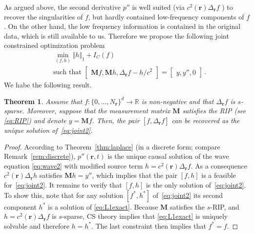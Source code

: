 \documentclass[11pt]{article}
\newcommand{\rr}{\mathbf r}
\newcommand{\data}{y}
\newcommand{\source}{f}
\newcommand{\Lsource}{h}
\newcommand{\R}{\mathbb R}
\newcommand\norm[1]{\Vert#1\Vert}
\newcommand{\set}[1]{\{#1\}}
\newcommand{\fullop}{\mathbf M}
\newtheorem{theorem}{Theorem}[section]
\begin{document}
As argued above, the second derivative $p''$
is  well suited (via $ c^2(\rr) \Delta_{\rr} \source$ ) to recover
the singularities of  $\source$, but hardly contained low-frequency
components of $\source$. On the other hand, the low frequency
information is contained in the original data, which is still available to us.
Therefore we propose the following joint constrained optimization problem
\begin{equation} \label{eq:joint2}
\begin{aligned}
&\min_{(\source, \Lsource)}  \norm{\Lsource}_1  +  I_{C} (\source)  \\
&\text{such that }
\begin{bmatrix}  \fullop\source,  \fullop\Lsource ,  \Delta_{\rr} \source  -    \Lsource/c^{2} \end{bmatrix} =
\begin{bmatrix} \data , \data'' ,0 \end{bmatrix}   \,.
\end{aligned}
\end{equation}
We habe the following result.

\begin{theorem}
	Assume that $\source \colon  \set{0, \dots, N_\rr}^d \to \R$  is
	non-negative and that  $\Delta_{\rr} \source$ is $s$-sparse.
	Moreover, suppose  that  the measurement matrix $\fullop$  satisfies the RIP
	(see \eqref{eq:RIP})  and denote $\data = \fullop\source$.
	Then, the pair $[\source, \Delta_{\rr} \source]$ can be recovered as the
	unique solution of~\eqref{eq:joint2}.
\end{theorem}

\begin{proof}
	According to Theorem~\ref{thm:laplace} (in a discrete form; compare Remark~\ref{rem:discrete}),
	$p''(\rr, t)$  is the unique causal
	solution of the wave equation \eqref{eq:wave2} with modified source term
	$\Lsource = c^2(\rr) \Delta_{\rr} \source$. As a consequence $c^2(\rr) \Delta_{\rr} \Lsource$ satisfies
	$\fullop\Lsource = \data'' $, which implies that the pair  $[\source, \Lsource]$
	is a feasible for~\eqref{eq:joint2}. It remains to verify that $[\source, \Lsource]$ is the only
	solution of~\eqref{eq:joint2}.  To show  this, note  that for  any solution
	$[\source^*, \Lsource^*]$ of~\eqref{eq:joint2} its second component $\Lsource^*$
	is a solution of \eqref{eq:L1exact}.
	Because $\fullop$ satisfies the $s$-RIP, and
	$\Lsource = c^2(\rr) \Delta_{\rr} \source$ is  $s$-sparse, CS
	theory implies that \eqref{eq:L1exact} is uniquely solvable \cite{CanRomTao06a,Don06,foucart2013mathematical} and therefore
	$\Lsource = \Lsource^*$. The last constraint then  implies that
	$ \source^* = \source$.
\end{proof}
\end{document}
